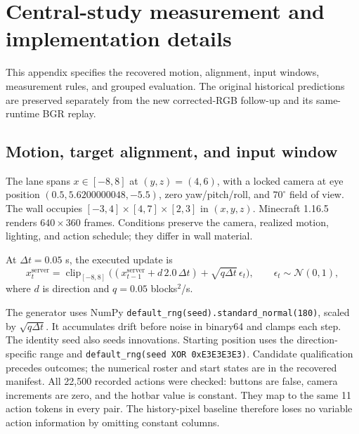 \documentclass{article}
\begin{document}
\clearpage


\clearpage
\appendix
\section{Central-study measurement and implementation details}
\label{app:central}
This appendix specifies the recovered motion, alignment, input windows, measurement rules, and grouped evaluation. The original historical predictions are preserved separately from the new corrected-RGB follow-up and its same-runtime BGR replay.

\subsection{Motion, target alignment, and input window}
The lane spans $x\in[-8,8]$ at $(y,z)=(4,6)$, with a locked camera at eye position $(0.5,5.6200000048,-5.5)$, zero yaw/pitch/roll, and $70^\circ$ field of view. The wall occupies $[-3,4]\times[4,7]\times[2,3]$ in $(x,y,z)$. Minecraft 1.16.5 renders $640\times360$ frames. Conditions preserve the camera, realized motion, lighting, and action schedule; they differ in wall material.

At $\Delta t=0.05$ s, the executed update is
\[
x^{\mathrm{server}}_t=\operatorname{clip}_{[-8,8]}
 \bigl((x^{\mathrm{server}}_{t-1}+d\,2.0\,\Delta t)+\sqrt{q\Delta t}\,\epsilon_t\bigr),
\qquad \epsilon_t\sim\mathcal N(0,1),
\]
where $d$ is direction and $q=0.05$ blocks$^2$/s.

The generator uses NumPy \texttt{default\_rng(seed).standard\_normal(180)}, scaled by $\sqrt{q\Delta t}$. It accumulates drift before noise in binary64 and clamps each step. The identity seed also seeds innovations. Starting position uses the direction-specific range and \texttt{default\_rng(seed XOR 0xE3E3E3E3)}. Candidate qualification precedes outcomes; the numerical roster and start states are in the recovered manifest. All 22,500 recorded actions were checked: buttons are false, camera increments are zero, and the hotbar value is constant. They map to the same 11 action tokens in every pair. The history-pixel baseline therefore loses no variable action information by omitting constant columns.
\end{document}
